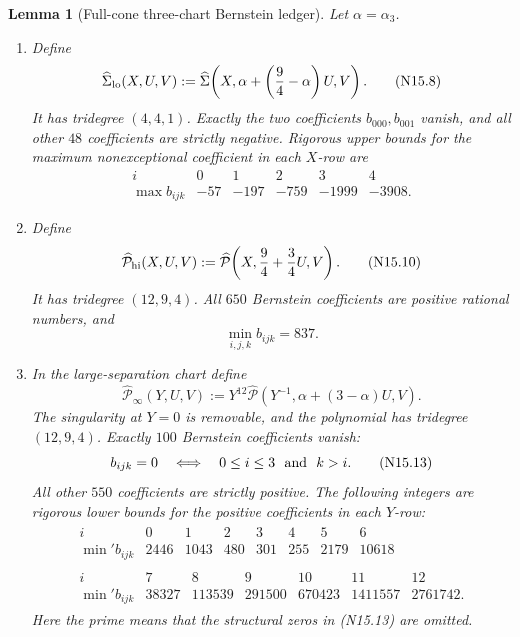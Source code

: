 \documentclass[11pt]{article}
\newtheorem{lemma}[theorem]{Lemma}
\theoremstyle{definition}
\theoremstyle{remark}
\begin{document}
\begin{lemma}[Full-cone three-chart Bernstein ledger]
\label{lem:f2v15-full-ledger}
Let \(\alpha=\alpha_3\).

\begin{enumerate}[label=\textup{(\roman*)}]
\item Define
\[
 \widehat\Sigma_{\rm lo}(X,U,V):=
 \widehat\Sigma\!\left(
 X,\alpha+\left(\frac94-\alpha\right)U,V\right).
 \tag{N15.8}
\]
It has tridegree \((4,4,1)\).  Exactly the two coefficients
\(b_{000},b_{001}\) vanish, and all other \(48\) coefficients are strictly
negative.  Rigorous upper bounds for the maximum nonexceptional
coefficient in each \(X\)-row are
\[
\begin{array}{c|rrrrr}
 i&0&1&2&3&4\\ \hline
 \max b_{ijk}
 &-57&-197&-759&-1999&-3908.
\end{array}
\tag{N15.9}
\]

\item Define
\[
 \widehat{\mathcal P}_{\rm hi}(X,U,V):=
 \widehat{\mathcal P}\!\left(
 X,\frac94+\frac34U,V\right).
 \tag{N15.10}
\]
It has tridegree \((12,9,4)\).  All \(650\) Bernstein coefficients are
positive rational numbers, and
\[
 \min_{i,j,k}b_{ijk}=837.
 \tag{N15.11}
\]

\item In the large-separation chart define
\[
 \widehat{\mathcal P}_\infty(Y,U,V):=
 Y^{12}\widehat{\mathcal P}\!\left(
 Y^{-1},\alpha+(3-\alpha)U,V\right).
 \tag{N15.12}
\]
The singularity at \(Y=0\) is removable, and the polynomial has
tridegree \((12,9,4)\).  Exactly \(100\) Bernstein coefficients vanish:
\[
 b_{ijk}=0
 \quad\Longleftrightarrow\quad
 0\leq i\leq3\ \hbox{ and }\ k>i.
 \tag{N15.13}
\]
All other \(550\) coefficients are strictly positive.  The following
integers are rigorous lower bounds for the positive coefficients in each
\(Y\)-row:
\[
\begin{gathered}
\begin{array}{c|rrrrrrr}
 i&0&1&2&3&4&5&6\\ \hline
 \min{}' b_{ijk}
 &2446&1043&480&301&255&2179&10618
\end{array}\\[2mm]
\begin{array}{c|rrrrrr}
 i&7&8&9&10&11&12\\ \hline
 \min{}' b_{ijk}
 &38327&113539&291500&670423&1411557&2761742.
\end{array}
\end{gathered}
\tag{N15.14}
\]
Here the prime means that the structural zeros in
\textup{(N15.13)} are omitted.
\end{enumerate}
\end{lemma}
\end{document}
